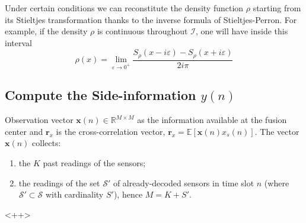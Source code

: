Under certain conditions we can reconstitute the density function $\rho$ starting from its Stieltjes transformation thanks to the inverse formula of Stieltjes-Perron. For example, if the density $\rho$ is continuous throughout $\mathcal{I}$, one will have inside this interval
\begin{equation}
    \rho(x) = \lim_{\varepsilon \rightarrow 0^{+}} \dfrac{S_{\rho}(x-i\varepsilon) - S_{\rho}(x+i\varepsilon)}{2i\pi}
    \label{eq-Stieltjesinverse}
\end{equation}




\subsection{Compute the Side-information $y(n)$}
Observation vector $\mathbf{x}(n) \in \mathbb{R}^{M\times M}$ as the information available at the fusion center and $\mathbf{r}_x$ is the cross-correlation vector, $\mathbf{r}_x = \mathbb{E}[\mathbf{x}(n)x_s(n)]$. The vector $\mathbf{x}(n)$ collects: 
\begin{enumerate}
    \item the $K$ past readings of the sensors;
    \item the readings of the set $\mathcal{S}'$ of already-decoded sensors in time slot $n$ (where $\mathcal{S}' \subset \mathcal{S}$ with cardinality $S'$), hence $M = K+S'$. 
\end{enumerate}<++>

